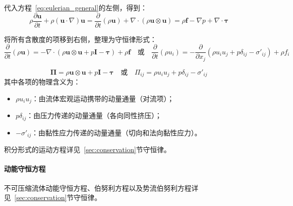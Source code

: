 代入方程~\eqref{eq:eulerian_general}的左侧，得到：
\begin{equation}
\rho \frac{\partial \mathbf{u}}{\partial t} + \rho(\mathbf{u}\cdot\nabla)\mathbf{u}
= \frac{\partial}{\partial t}(\rho \mathbf{u}) + \nabla\cdot(\rho \mathbf{u}\otimes\mathbf{u})
= \rho \mathbf{f} - \nabla p + \nabla \cdot \boldsymbol{\tau}
\end{equation}

将所有含散度的项移到右侧，整理为守恒律形式：
\begin{equation}\label{eq:momentum_conservation}
\frac{\partial}{\partial t}(\rho \mathbf{u})
= -\nabla\cdot(\rho \mathbf{u}\otimes\mathbf{u} + p\mathbf{I} - \boldsymbol{\tau}) + \rho \mathbf{f}
\quad \text{或} \quad
\frac{\partial}{\partial t}(\rho u_i) = -\frac{\partial}{\partial x_j}\left(\rho u_i u_j + p\delta_{ij} - \sigma'_{ij}\right) + \rho f_i
\end{equation}

\begin{definition}
    \begin{equation}
    \boldsymbol{\Pi} = \rho \mathbf{u}\otimes\mathbf{u} + p\mathbf{I} - \boldsymbol{\tau}
    \quad \text{或} \quad
    \Pi_{ij} = \rho u_i u_j + p\delta_{ij} - \sigma'_{ij}
    \end{equation}
其中各项的物理含义为：
\begin{itemize}
    \item $\rho u_i u_j$：由流体宏观运动携带的动量通量（对流项）；
    \item $p\delta_{ij}$：由压力传递的动量通量（各向同性挤压）；
    \item $-\sigma'_{ij}$：由黏性应力传递的动量通量（切向和法向黏性应力）。
\end{itemize}
\end{definition}

积分形式的运动方程详见~\eqref{sec:conservation}节守恒律。

\paragraph{动能守恒方程}
不可压缩流体动能守恒方程、伯努利方程以及势流伯努利方程详见~\eqref{sec:conservation}节守恒律。

